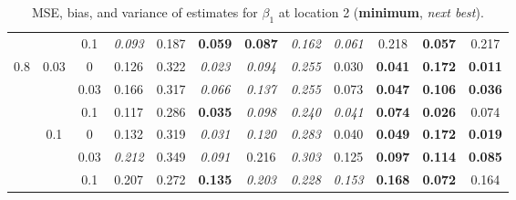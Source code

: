 \documentclass[authoryear, review, 11pt]{elsarticle}
\begin{document}
\begin{table}[ht]
\begin{center}
\begin{tabular}{ccc | ccc | ccc | ccc }
		 &  & 0.1 &   \emph{0.093} & 0.187 & \textbf{0.059} & \textbf{0.087} & \emph{0.162} & \emph{0.061} & 0.218 & \textbf{0.057} & 0.217 \\ \cline{1-12}
		\multirow{6}{*}{0.8} & \multirow{3}{*}{0.03} & 0 &   0.126 & 0.322 & \emph{0.023} & \emph{0.094} & \emph{0.255} & 0.030 & \textbf{0.041} & \textbf{0.172} & \textbf{0.011} \\ 
		 &  & 0.03 &   0.166 & 0.317 & \emph{0.066} & \emph{0.137} & \emph{0.255} & 0.073 & \textbf{0.047} & \textbf{0.106} & \textbf{0.036} \\ 
		 &  & 0.1 &   0.117 & 0.286 & \textbf{0.035} & \emph{0.098} & \emph{0.240} & \emph{0.041} & \textbf{0.074} & \textbf{0.026} & 0.074 \\ \cline{2-12}
		 & \multirow{3}{*}{0.1} & 0 &   0.132 & 0.319 & \emph{0.031} & \emph{0.120} & \emph{0.283} & 0.040 & \textbf{0.049} & \textbf{0.172} & \textbf{0.019} \\ 
		 &  & 0.03 &   \emph{0.212} & 0.349 & \emph{0.091} & 0.216 & \emph{0.303} & 0.125 & \textbf{0.097} & \textbf{0.114} & \textbf{0.085} \\ 
		 &  & 0.1 &   0.207 & 0.272 & \textbf{0.135} & \emph{0.203} & \emph{0.228} & \emph{0.153} & \textbf{0.168} & \textbf{0.072} & 0.164 \\ 
		  \end{tabular}
		\caption{MSE, bias, and variance of estimates for $\beta_1$ at location 2 (\textbf{minimum}, \emph{next best}).\label{table:loc2-estimation}}
		\end{center}
		\end{table}

		
		
\end{document}
